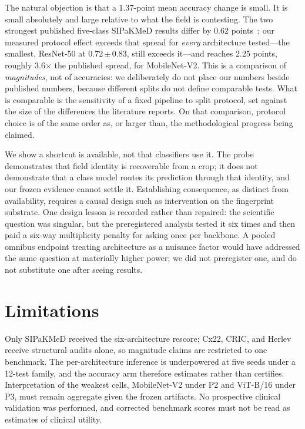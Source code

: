\documentclass[conference]{IEEEtran}
\newcommand{\meanpm}[2]{#1\,$\pm$\,#2}
\newcommand{\protocol}[1]{\textsf{#1}}
\begin{document}
The natural objection is that a 1.37-point mean accuracy change is small.
It is small absolutely and large relative to what the field is contesting.
The two strongest published five-class SIPaKMeD results differ by 0.62 points~\cite{rahaman2021deepcervix,gao2022knowledge}; our measured protocol effect exceeds that spread for \emph{every} architecture tested---the smallest, ResNet-50 at \meanpm{0.72}{0.83}, still exceeds it---and reaches 2.25 points, roughly 3.6$\times$ the published spread, for MobileNet-V2.
This is a comparison of \emph{magnitudes}, not of accuracies: we deliberately do not place our numbers beside published numbers, because different splits do not define comparable tests.
What is comparable is the sensitivity of a fixed pipeline to split protocol, set against the size of the differences the literature reports.
On that comparison, protocol choice is of the same order as, or larger than, the methodological progress being claimed.

We show a shortcut is available, not that classifiers use it.
The probe demonstrates that field identity is recoverable from a crop; it does not demonstrate that a class model routes its prediction through that identity, and our frozen evidence cannot settle it.
Establishing consequence, as distinct from availability, requires a causal design such as intervention on the fingerprint substrate.
One design lesson is recorded rather than repaired: the scientific question was singular, but the preregistered analysis tested it six times and then paid a six-way multiplicity penalty for asking once per backbone.
A pooled omnibus endpoint treating architecture as a nuisance factor would have addressed the same question at materially higher power; we did not preregister one, and do not substitute one after seeing results.

\section{Limitations}
Only SIPaKMeD received the six-architecture rescore; Cx22, CRIC, and Herlev receive structural audits alone, so magnitude claims are restricted to one benchmark.
The per-architecture inference is underpowered at five seeds under a 12-test family, and the accuracy arm therefore estimates rather than certifies.
Interpretation of the weakest cells, MobileNet-V2 under \protocol{P2} and ViT-B/16 under \protocol{P3}, must remain aggregate given the frozen artifacts.
No prospective clinical validation was performed, and corrected benchmark scores must not be read as estimates of clinical utility.
\end{document}
